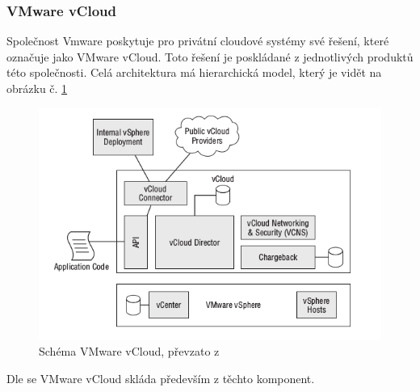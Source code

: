 \subsubsection{VMware vCloud}

Společnost Vmware poskytuje pro privátní cloudové systémy své řešení, které označuje jako VMware vCloud. Toto řešení je poskládané z jednotlivých produktů této společnosti. Celá architektura má hierarchická model, který je vidět na obrázku č. \ref{fig:vmware}

\begin{figure}[h]
\begin{centering}
\includegraphics[scale=0.65]{images/vmware}
\par\end{centering}
\caption{Schéma VMware vCloud, převzato z \cite{vmware}\label{fig:vmware}}
\end{figure}

Dle \cite{vmware} se VMware vCloud skláda především z těchto komponent.

